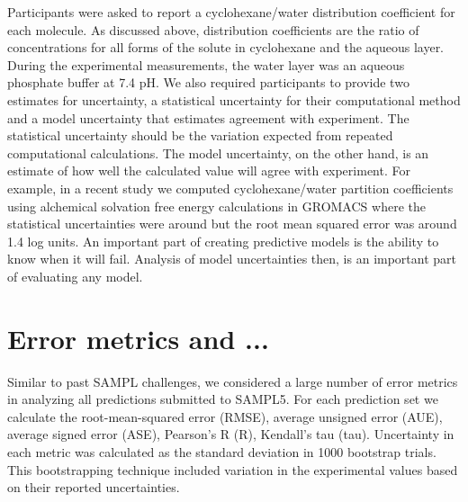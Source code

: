 Participants were asked to report a cyclohexane/water distribution coefficient for each molecule. 
As discussed above, distribution coefficients are the ratio of concentrations for all forms of the solute in cyclohexane and the aqueous layer. 
During the experimental measurements, the water layer was an aqueous phosphate %
buffer at 7.4 pH. 
We also required participants to provide two estimates for uncertainty, a statistical uncertainty for their computational method and a model uncertainty that estimates agreement with experiment.  
The statistical uncertainty should be the variation expected from repeated computational calculations. 
The model uncertainty, on the other hand, is an estimate of how well the calculated value will agree with experiment. 
For example, in a recent study we computed cyclohexane/water partition coefficients using alchemical solvation free energy calculations in GROMACS where the statistical uncertainties were around %
but the root mean squared error was around 1.4 log units. 
An important part of creating predictive models is the ability to know when it will fail. 
Analysis of model uncertainties then, is an important part of evaluating any model. 

\section{Error metrics and ...}
\label{analysisMethods}
Similar to past SAMPL challenges, we considered a large number of error metrics in analyzing all predictions submitted to SAMPL5. 
For each prediction set we calculate the root-mean-squared error (RMSE), average unsigned error (AUE), average signed error (ASE), Pearson's R (R), Kendall's tau (tau). %
Uncertainty in each metric was calculated as the standard deviation in 1000 bootstrap trials. 
This bootstrapping technique included variation in the experimental values based on their reported uncertainties.  %

